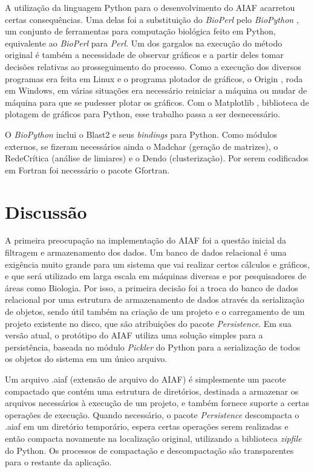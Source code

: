 A utilização da linguagem Python para o desenvolvimento do AIAF acarretou certas consequências. Uma delas foi a substituição do \textit{BioPerl} pelo
\textit{BioPython} \cite{biopython}, um conjunto de ferramentas para computação biológica feito em Python, equivalente ao \textit{BioPerl} para \textit{Perl}.
Um dos gargalos na execução do método original é também a necessidade de observar gráficos e a partir deles tomar decisões relativas ao prosseguimento do
processo. Como a execução dos diversos programas era feita em Linux e o programa plotador de gráficos, o Origin \cite{origin}, roda em Windows, em várias
situações era necessário reiniciar a máquina ou mudar de máquina para que se pudesser plotar os gráficos. Com o Matplotlib \cite{matplotlib}, biblioteca de 
plotagem de gráficos para Python, esse trabalho passa a ser desnecessário.

O \textit{BioPython} inclui o Blast2 e seus \textit{bindings} para Python. Como módulos externos, se fizeram necessários ainda o Madchar (geração de matrizes),
o RedeCrítica (análise de limiares) e o Dendo (clusterização). Por serem codificados em Fortran foi necessário o pacote Gfortran.

\section{Discussão} \label{sec:discussao}

A primeira preocupação na implementação do AIAF foi a questão inicial da filtragem e armazenamento dos dados. Um banco de dados relacional é uma exigência
muito grande para um sistema que vai realizar certos cálculos e gráficos, e que será utilizado em larga escala em máquinas diversas e por pesquisadores de
áreas como Biologia. Por isso, a primeira decisão foi a troca do banco de dados relacional por uma estrutura de armazenamento de dados através da serialização
de objetos, sendo útil também na criação de um projeto e o carregamento de um projeto existente no disco, que são atribuições do pacote 
\textit{Persistence}. Em sua versão atual, o protótipo do AIAF utiliza uma solução simples para a persistência, baseada no módulo \textit{Pickler} do
Python para a serialização de todos os objetos do sistema em um único arquivo.


Um arquivo .aiaf (extensão de arquivo do AIAF) é simplesmente um pacote compactado que contém uma estrutura de diretórios, destinada a armazenar os arquivos
necessários à execução de um projeto, e também fornece suporte a certas operações de execução. Quando necessário, o pacote \textit{Persistence} descompacta
o .aiaf em um diretório temporário, espera certas operações serem realizadas e então compacta novamente na localização original, utilizando a biblioteca
\textit{zipfile} do Python. Os processos de compactação e descompactação são transparentes para o restante da aplicação.

